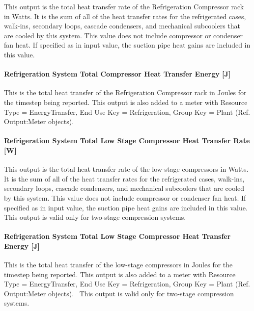 This output is the total heat transfer rate of the Refrigeration Compressor rack in Watts. It is the sum of all of the heat transfer rates for the refrigerated cases, walk-ins, secondary loops, cascade condensers, and mechanical subcoolers that are cooled by this system. This value does not include compressor or condenser fan heat. If specified as in input value, the suction pipe heat gains are included in this value.

\paragraph{Refrigeration System Total Compressor Heat Transfer Energy {[}J{]}}\label{refrigeration-system-total-compressor-heat-transfer-energy-j}

This is the total heat transfer of the Refrigeration Compressor rack in Joules for the timestep being reported. This output is also added to a meter with Resource Type = EnergyTransfer, End Use Key = Refrigeration, Group Key = Plant (Ref. Output:Meter objects).

\paragraph{Refrigeration System Total Low Stage Compressor Heat Transfer Rate {[}W{]}}\label{refrigeration-system-total-low-stage-compressor-heat-transfer-rate-w}

This output is the total heat transfer rate of the low-stage compressors in Watts. It is the sum of all of the heat transfer rates for the refrigerated cases, walk-ins, secondary loops, cascade condensers, and mechanical subcoolers that are cooled by this system. This value does not include compressor or condenser fan heat. If specified as in input value, the suction pipe heat gains are included in this value.~ This output is valid only for two-stage compression systems.

\paragraph{Refrigeration System Total Low Stage Compressor Heat Transfer Energy {[}J{]}}\label{refrigeration-system-total-low-stage-compressor-heat-transfer-energy-j}

This is the total heat transfer of the low-stage compressors in Joules for the timestep being reported. This output is also added to a meter with Resource Type = EnergyTransfer, End Use Key = Refrigeration, Group Key = Plant (Ref. Output:Meter objects).~ This output is valid only for two-stage compression systems.

